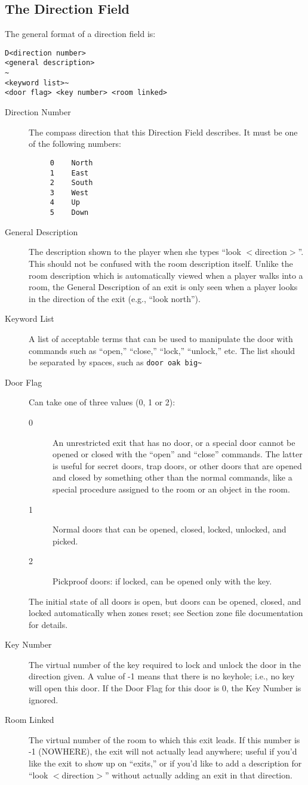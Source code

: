 \documentclass[11pt]{article}
\begin{document}
\subsection{The Direction Field}
The general format of a direction field is:
\begin{verbatim}
D<direction number>
<general description>
~
<keyword list>~
<door flag> <key number> <room linked>
\end{verbatim}
\begin{description}
\item[Direction Number] The compass direction that this Direction Field describes.  It must be one of the following numbers:
\begin{verbatim}
     0    North
     1    East
     2    South
     3    West
     4    Up
     5    Down 
\end{verbatim}
\item[General Description] The description shown to the player when she types ``look $<$direction$>$''.  This should not be confused with the room description itself.  Unlike the room description which is automatically viewed when a player walks into a room, the General Description of an exit is only seen when a player looks in the direction of the exit (e.g., ``look north'').
\item[Keyword List] A list of acceptable terms that can be used to manipulate the door with
commands such as ``open,'' ``close,'' ``lock,'' ``unlock,'' etc. The list should be separated by spaces, such as \verb*=door oak big~=
\item[Door Flag] Can take one of three values (0, 1 or 2):
\begin{description}
\item[0] An unrestricted exit that has no door, or a special door cannot be opened or closed with the ``open'' and ``close'' commands.  The latter is useful for secret doors, trap doors, or other doors that are opened and closed by something other than the normal commands, like a special procedure assigned to the room or an object in the room.
\item[1] Normal doors that can be opened, closed, locked, unlocked, and picked.
\item[2] Pickproof doors: if locked, can be opened only with the key.
\end{description}
The initial state of all doors is open, but doors can be opened, closed, and locked automatically when zones reset; see Section zone file documentation for details.
\item[Key Number] The virtual number of the key required to lock and unlock the door in the direction given.  A value of -1 means that there is no keyhole; i.e., no key will open this door.  If the Door Flag for this door is 0, the Key Number is ignored.
\item[Room Linked] The virtual number of the room to which this exit leads.  If this number is -1 (NOWHERE), the exit will not actually lead anywhere; useful if you'd like the exit to show up on ``exits,'' or if you'd like to add a description for ``look $<$direction$>$'' without actually adding an exit in that direction.
\end{description}
\end{document}
